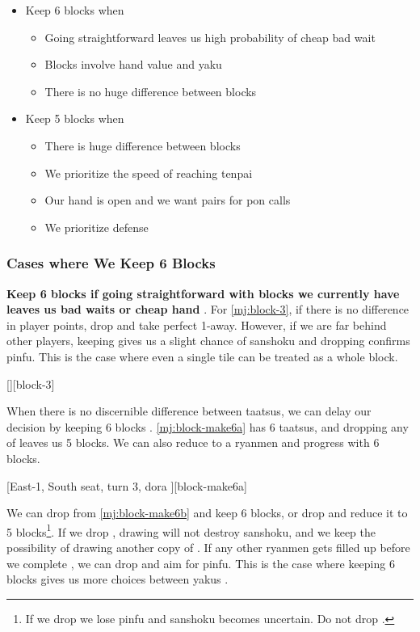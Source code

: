 \documentclass[12pt]{article}
\newlength\stdbls %
\newcommand{\mjfn}[1]{\raisebox{-.135\stdbls}{\mahjong[0.75\stdbls]{#1}}}
\begin{document}
\begin{itemize}
  \item Keep 6 blocks when
  \begin{itemize}
    \item Going straightforward leaves us high probability of cheap bad wait
    \item Blocks involve hand value and yaku
    \item There is no huge difference between blocks
  \end{itemize}
  \item Keep 5 blocks when
  \begin{itemize}
    \item There is huge difference between blocks
    \item We prioritize the speed of reaching tenpai
    \item Our hand is open and we want pairs for pon calls
    \item We prioritize defense
  \end{itemize}
\end{itemize}


\subsubsection*{Cases where We Keep 6 Blocks}

\textbf{Keep 6 blocks if going straightforward with blocks we currently have leaves us bad waits or cheap hand} \citep[][p. 23]{uzaku-haikouritsu}. For \ref{mj:block-3}, if there is no difference in player points, drop  and take perfect 1-away. However, if we are far behind other players, keeping  gives us a slight chance of sanshoku and dropping  confirms pinfu. This is the case where even a single tile can be treated as a whole block.

[][block-3]

When there is no discernible difference between taatsus, we can delay our decision by keeping 6 blocks \citep{yoteru-6block}. \ref{mj:block-make6a} has 6 taatsus, and dropping any of  leaves us 5 blocks. We can also reduce  to a ryanmen and progress with 6 blocks.

[East-1, South seat, turn 3, dora ][block-make6a]

We can drop  from \ref{mj:block-make6b} and keep 6 blocks, or drop  and reduce it to 5 blocks\footnote{If we drop \mjfn{7s} we lose pinfu and sanshoku becomes uncertain. Do not drop \mjfn{7s}.}. If we drop , drawing  will not destroy sanshoku, and we keep the possibility of drawing another copy of . If any other ryanmen gets filled up before we complete , we can drop  and aim for pinfu. This is the case where keeping 6 blocks gives us more choices between yakus \citep{yuusee-6block-1}.
\end{document}
